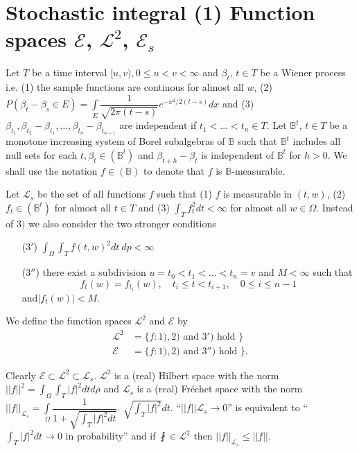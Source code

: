 \section{Stochastic integral (1) Function spaces $\mathscr{E}$,
  $\mathscr{L}^2$, $\mathscr{E}_s$}\label{chap5-sec2} 

Let $T$ be a time interval $[u, v), 0 \leq u < v < \infty$ and
  $\beta_t$, $t \in T$ be a Wiener process i.e. (1) the sample
  functions are continous for almost all $w$, (2) $P(\beta_t - \beta_s
  \in E) = \int \limits_E \dfrac{1}{\sqrt{2 \pi (t - s)}} e^{-x^2/2
    (t-s)} dx$ and (3) $\beta_{t_{1}}, \beta_{t_{2}} - \beta_{t_{1}},
  \ldots , \beta_{t_n} - \beta_{t_{n-1}}$ are independent if $t_1<
  \ldots < t_n \in T$. Let $\mathbb{B}^t$, $t \in T$ be a monotone
  increasing system of Borel subalgebras of $\mathbb{B}$ such that
  $\mathbb{B}^t$ includes all null sets for each $t, \beta_t \in
  (\mathbb{B}^t)$ and $\beta_{t+h}- \beta_t$ is independent
  of $\mathbb{B}^t$ for $h>0$. We shall use the notation $f \in
  (\mathbb{B})$ to denote that $f$ is $\mathbb{B}$-measurable. 

Let $\mathscr{L}_s$ be the set of all functions $f$ such that (1) $f$
is measurable in $(t, w)$, (2) $f_t \in (\mathbb{B}^t)$ for almost all $t
\in T$ and (3) $\int_T f^2_t dt < \infty$ for almost all $w \in
\Omega$. Instead of $3) $ we also consider the two stronger conditions  
\begin{itemize}
\item[(3$'$)] $\int_{\Omega} \int_T f(t, w)^2 dt\ dp < \infty$

\item[(3$''$)] there exist a subdivision $u = t_0 < t_1 < \ldots < t_n = v$
and $M < \infty$ such that  
$$
f_t(w) = f_{t_{i}}(w),\quad t_i \leq t <  t_{i+1},\quad 0 \leq i \leq n-1
$$
and\pageoriginale $|f_t(w)| < M$.
\end{itemize}

We define the function spaces $\mathscr{L}^2$ and $\mathscr{E}$ by 
\begin{align*}
  \mathscr{L}^2 & = \{ f : 1), 2) \text{ and } 3') \text{ hold } \}\\
  \mathscr{E} & = \{ f : 1), 2) \text{ and } 3'') \text{ hold } \} .
\end{align*}

Clearly $\mathscr{E} \subset \mathscr{L}^2 \subset
\mathscr{L}_s$. $\mathscr{L}^2$ is a (real) Hilbert space with the
norm $|| f||^2 = \int_{\Omega} \int_{T}|f|^2 dt d \rho$ and
$\mathscr{L}_s$ is a (real) Fr\'echet space with the norm $|| f
||_{\mathscr{L}_s} = \int\limits_{\Omega} \dfrac{1}{1+ \sqrt{\int_T
    |f|^2 dt}}$. $\sqrt{\int_T |f|^2} dt$. ``$|| f|| \mathscr{L}_s \to
0$'' is equivalent to ``$\int_T |f|^2 dt \to 0$ in probability'' and
if $\fint \in \mathscr{L}^2$ then $|| f||_{\mathscr{L}_s} \leq ||
f||$. 

